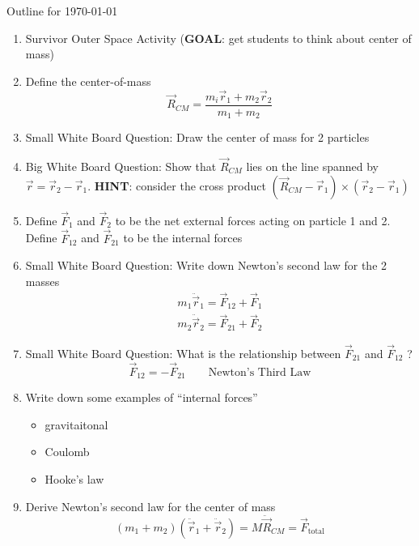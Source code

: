 \documentclass{letter}
\begin{document}
\begin{center}
  \centering \Large{Outline for \today}
\end{center}



\begin{enumerate}
\item Survivor Outer Space Activity (\textbf{GOAL}: get students to think about
  center of mass)
\item Define the center-of-mass
  \begin{equation}
    \vec{R}_{CM} = \frac{m_i\vec{r}_1+m_2\vec{r}_2}{m_1+m_2}
  \end{equation}
\item Small White Board Question: Draw the center of mass for 2 particles
\item Big White Board Question: Show that $\vec{R}_{CM}$ lies on the line
  spanned by $\vec{r}=\vec{r}_2-\vec{r}_1$. \textbf{HINT}: consider the
  cross product $(\vec{R}_{CM}-\vec{r}_1)\times(\vec{r}_2-\vec{r}_1)$
\item Define $\vec{F}_1$ and $\vec{F}_2$ to be the net external forces acting on
  particle 1 and 2. Define $\vec{F}_{12}$ and $\vec{F}_{21}$ to be the internal
  forces
  
\item Small White Board Question: Write down Newton's second law for the 2
  masses
  \begin{align}
    m_1\ddot\vec{r}_1 = \vec{F}_{12} + \vec{F}_1 \\
    m_2\ddot\vec{r}_2 = \vec{F}_{21} + \vec{F}_2
  \end{align}
\item Small White Board Question: What is the relationship between
  $\vec{F}_{21}$  and $\vec{F}_{12}$ ?
  \begin{equation}
    \vec{F}_{12} = -\vec{F}_{21} \qquad \text{Newton's Third Law}
  \end{equation}

\item Write down some examples of ``internal forces''
  \begin{itemize}
    \item gravitaitonal
    \item Coulomb
    \item Hooke's law
  \end{itemize}
  
\item Derive Newton's second law for the center of mass
  \begin{equation}
    (m_1+m_2)(\ddot{\vec{r}}_1+\ddot{\vec{r}}_2) = M\ddot{\vec{R}}_{CM} = \vec{F}_{\text{total}}
  \end{equation}


\end{enumerate}
\end{document}
